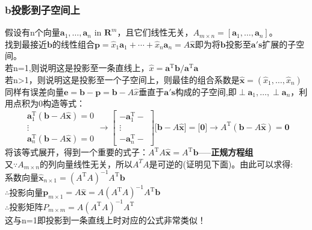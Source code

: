     \subsubsection{b投影到子空间上}
    假设有n个向量$\boldsymbol{a}_{1}, \ldots, \boldsymbol{a}_{n}$ in $\mathbf{R}^{m}$，且它们线性无关，$A_{m\times n}=[\boldsymbol{a}_{1}, \ldots, \boldsymbol{a}_{n}]$。
    \\
    找到最接近$\bm{b}$的线性组合$\boldsymbol{p}=\widehat{x}_{1} \boldsymbol{a}_{1}+\cdots+\widehat{x}_{n} \boldsymbol{a}_{n}=A \widehat{\boldsymbol{x}}$即为将$\bm{b}$投影至$\bm{a's}$扩展的子空间。
    \\
    若n=1,则说明这是投影至一条直线上，$\widehat{x}=\boldsymbol{a}^{\mathrm{T}} \boldsymbol{b} / \boldsymbol{a}^{\mathrm{T}} \boldsymbol{a}$
    \\
    若n>1，则说明这是投影至一个子空间上，则最佳的组合系数是$\widehat{\boldsymbol{x}}=\left(\widehat{x}_{1}, \dots, \widehat{x}_{n}\right)$
    \\
    同样有误差向量$\bm{e}=\bm{b}-\bm{p}=\bm{b}-A \widehat{x}$垂直于$\bm{a's}$构成的子空间,即$\perp \boldsymbol{a}_{1}, \ldots, \perp \boldsymbol{a}_{n}$，利用点积为0构造等式：
    \\
    $$
    \begin{array}{c}
        \boldsymbol{a}_{1}^{\mathrm{T}}(\boldsymbol{b}-A \widehat{\boldsymbol{x}})=0\\
        \vdots  \\
        \boldsymbol{a}_{n}^{\mathrm{T}}(\boldsymbol{b}-A \widehat{\boldsymbol{x}})=0
    \end{array}
    \rightarrow
    \left[\begin{array}{c}{-\boldsymbol{a}_{1}^{\mathrm{T}}-} \\ {\vdots} \\ {-\boldsymbol{a}_{n}^{\mathrm{T}}-}\end{array}\right]\Bigg[\boldsymbol{b}-A \widehat{\boldsymbol{x}}\Bigg]=\Bigg[\mathbf{0}\Bigg]
    \rightarrow
    A^{\mathrm{T}}(\boldsymbol{b}-A \widehat{\boldsymbol{x}})=\mathbf{0}
    $$
    将该等式展开，得到一个重要的式子：$A^{\mathrm{T}} A \widehat{\boldsymbol{x}}=A^{\mathrm{T}} \boldsymbol{b}$-----\textbf{正规方程组}
    \\
    又$\because A_{m\times n}$的列向量线性无关，所以$A^T A$是可逆的(证明见下面)。由此可以求得:\\
    系数向量$\widehat{\bm{x}}_{n\times 1}=\left(A^{\mathrm{T}} A\right)^{-1} A^{\mathrm{T}} \boldsymbol{b}$
    \\
    $\therefore$投影向量$\bm{p}_{m\times 1}=A \widehat{\bm{x}}=A\left(A^{\mathrm{T}} A\right)^{-1} A^{\mathrm{T}} \bm{b}$
    \\
    $\therefore$投影矩阵$P_{m\times m}=A\left(A^{\mathrm{T}} A\right)^{-1} A^{\mathrm{T}}$
    \\
    这与n=1即投影到一条直线上时对应的公式非常类似！

